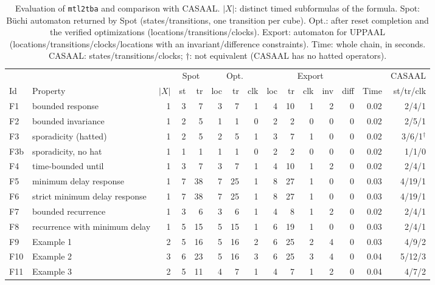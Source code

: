 \begin{table}[t]
\centering
\caption{Evaluation of \texttt{mtl2tba} and comparison with CASAAL. $|X|$: distinct timed subformulas of the formula. Spot: B\"uchi automaton returned by Spot (states/transitions, one transition per cube). Opt.: after reset completion and the verified optimizations (locations/transitions/clocks). Export: automaton for UPPAAL (locations/transitions/clocks/locations with an invariant/difference constraints). Time: whole chain, in seconds. CASAAL: states/transitions/clocks; $\dagger$: not equivalent (CASAAL has no hatted operators).}
\label{tab:evaluation}
\small
\begin{tabular}{@{}llrrrrrrrrrrrrr@{}}
\toprule
 & & & \multicolumn{2}{c}{Spot} & \multicolumn{3}{c}{Opt.} & \multicolumn{5}{c}{Export} & & CASAAL\\
\cmidrule(lr){4-5}\cmidrule(lr){6-8}\cmidrule(lr){9-13}
Id & Property & $|X|$ & st & tr & loc & tr & clk & loc & tr & clk & inv & diff & Time & st/tr/clk\\
\midrule
F1 & bounded response & 1 & 3 & 7 & 3 & 7 & 1 & 4 & 10 & 1 & 2 & 0 & 0.02 & 2/4/1\\
F2 & bounded invariance & 1 & 2 & 5 & 1 & 1 & 0 & 2 & 2 & 0 & 0 & 0 & 0.02 & 2/5/1\\
F3 & sporadicity (hatted) & 1 & 2 & 5 & 2 & 5 & 1 & 3 & 7 & 1 & 0 & 0 & 0.02 & 3/6/1$^\dagger$\\
F3b & sporadicity, no hat & 1 & 1 & 1 & 1 & 1 & 0 & 2 & 2 & 0 & 0 & 0 & 0.02 & 1/1/0\\
F4 & time-bounded until & 1 & 3 & 7 & 3 & 7 & 1 & 4 & 10 & 1 & 2 & 0 & 0.02 & 2/4/1\\
F5 & minimum delay response & 1 & 7 & 38 & 7 & 25 & 1 & 8 & 27 & 1 & 0 & 0 & 0.03 & 4/19/1\\
F6 & strict minimum delay response & 1 & 7 & 38 & 7 & 25 & 1 & 8 & 27 & 1 & 0 & 0 & 0.03 & 4/19/1\\
F7 & bounded recurrence & 1 & 3 & 6 & 3 & 6 & 1 & 4 & 8 & 1 & 2 & 0 & 0.02 & 2/4/1\\
F8 & recurrence with minimum delay & 1 & 5 & 15 & 5 & 15 & 1 & 6 & 19 & 1 & 0 & 0 & 0.03 & 2/4/1\\
F9 & Example 1 & 2 & 5 & 16 & 5 & 16 & 2 & 6 & 25 & 2 & 4 & 0 & 0.03 & 4/9/2\\
F10 & Example 2 & 3 & 6 & 23 & 5 & 16 & 3 & 6 & 25 & 3 & 4 & 0 & 0.04 & 5/12/3\\
F11 & Example 3 & 2 & 5 & 11 & 4 & 7 & 1 & 4 & 7 & 1 & 2 & 0 & 0.04 & 4/7/2\\

\end{tabular}
\end{table}
